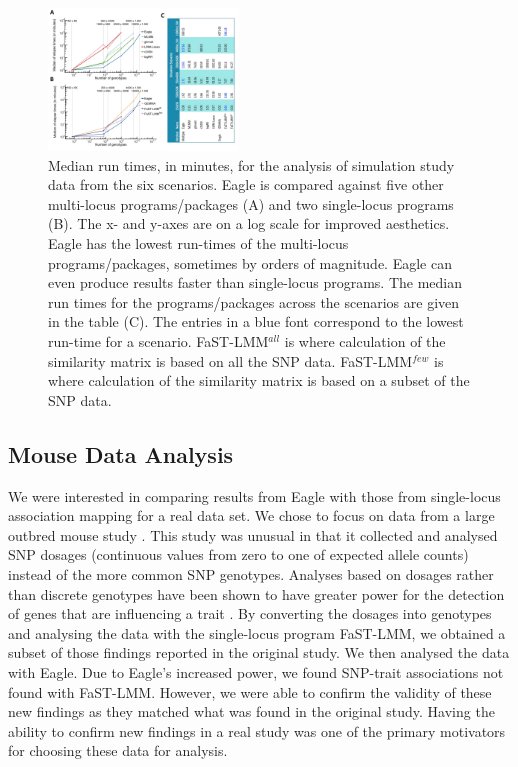 \documentclass{bioinfo}
\begin{document}
 
\begin{figure}
 \centerline{\includegraphics[width=0.45\textwidth,natwidth=610,natheight=642]{Figure2_time.jpg}}
 \caption{
Median run times, in minutes, for the analysis of simulation study data from the six scenarios. Eagle is compared against five other multi-locus programs/packages (A) and two single-locus programs (B). The x- and y-axes are on a log scale for improved aesthetics. Eagle has the lowest run-times of the multi-locus programs/packages, sometimes by orders of magnitude. Eagle can even produce results faster than single-locus programs. The median run times for the programs/packages across the scenarios are given in the table (C). The entries in a blue font  correspond to the lowest run-time for a scenario. FaST-LMM$^{all}$ is where calculation of the similarity matrix is based on all the SNP data.  
 FaST-LMM$^{few}$ is where calculation  of the similarity matrix is based on a subset of the SNP data. }
\label{fig_time}
\end{figure}

 





\subsection{Mouse Data Analysis}


We were interested in comparing results from Eagle with those from single-locus association mapping for a real data set.
 We chose to focus on data from a large outbred mouse study \citep{nicod2016genome}. This study was unusual in that it collected and analysed SNP dosages (continuous values from zero to one of expected allele counts)  instead of the more common SNP genotypes. Analyses based on dosages rather than discrete genotypes have been shown to have greater power for the detection of genes that are influencing a trait  \citep{zheng2011comparison}. By converting the dosages into genotypes and analysing the data with the single-locus program FaST-LMM, we obtained a subset of those findings reported in the original study. We then analysed the data with Eagle. Due to Eagle's increased power, we found SNP-trait associations not found with  FaST-LMM. However, we were 
 able to confirm the validity of these new findings as they matched what was found in the original study. Having the ability to confirm new findings  in a real study was 
 one of the primary motivators for choosing these data for analysis. 
\end{document}
